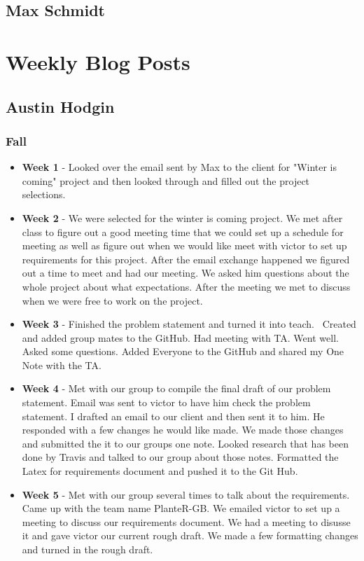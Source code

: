 \documentclass[onecolumn, draftclsnofoot,10pt, compsoc]{IEEEtran}
\begin{document}
		\subsection{Max Schmidt}
		

	\section{Weekly Blog Posts}
		\subsection{Austin Hodgin}
			\subsubsection{Fall}
				\begin{itemize}
					\item \textbf{Week 1} - Looked over the email sent by Max to the client for "Winter is coming" project and then looked through and filled out the project selections. 
					\item \textbf{Week 2} -  We were selected for the winter is coming project. We met after class to figure out a good meeting time that we could set up a schedule for meeting as well as figure out when we would like meet with victor to set up requirements for this project. After the email exchange happened we figured out  a time to meet and had our meeting. We asked him questions about the whole project about what expectations. After the meeting we met to discuss when we were free to work on the project.
					\item \textbf{Week 3} - Finished the problem statement and turned it into teach.  Created and added group mates to the GitHub. Had meeting with TA. Went well. Asked some questions. Added Everyone to the GitHub and shared my One Note with the TA.
					\item \textbf{Week 4} - Met with our group to compile the final draft of our problem statement.  Email was sent to victor to have him check the problem statement.  I drafted an email to our client and then sent it to him. He responded with a few changes he would like made. We made those changes and submitted the it to our groups one note.  Looked research that has been done by Travis and talked to our group about those notes. Formatted the Latex for requirements document and pushed it to the Git Hub.
					\item \textbf{Week 5} - Met with our group several times to talk about the requirements. Came up with the team name PlanteR-GB. We emailed victor to set up a meeting to discuss our requirements document. We had a meeting to disusse it and gave victor our current rough draft.  We made a few formatting changes and turned in the rough draft.

\end{itemize}
\end{document}

